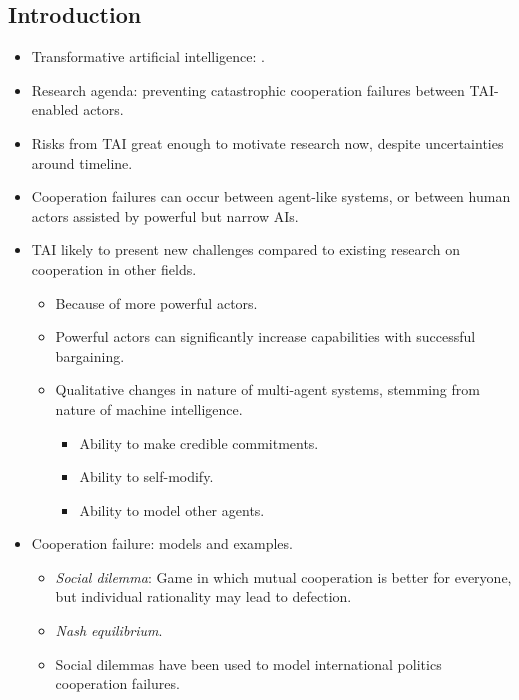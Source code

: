 \subsection{Introduction}

\begin{itemize}
    \item Transformative artificial intelligence: .
    \item Research agenda: preventing catastrophic cooperation failures between TAI-enabled actors.
    \item Risks from TAI great enough to motivate research now, despite uncertainties around timeline.
    \item Cooperation failures can occur between agent-like systems, or between human actors assisted by powerful but narrow AIs.
    \item TAI likely to present new challenges compared to existing research on cooperation in other fields.
    \begin{itemize}
        \item Because of more powerful actors.
        \item Powerful actors can significantly increase capabilities with successful bargaining.
        \item Qualitative changes in nature of multi-agent systems, stemming from nature of machine intelligence.
        \begin{itemize}
            \item Ability to make credible commitments.
            \item Ability to self-modify.
            \item Ability to model other agents.
        \end{itemize}
    \end{itemize}
    \item Cooperation failure: models and examples.
    \begin{itemize}
        \item \emph{Social dilemma}: Game in which mutual cooperation is better for everyone, but individual rationality may lead to defection.
        \item \emph{Nash equilibrium}.
        \item Social dilemmas have been used to model international politics cooperation failures.
        \begin{itemize}

\end{itemize}
\end{itemize}
\end{itemize}
